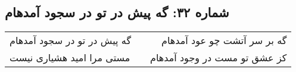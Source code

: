 \begin{center}
\section*{شماره ۳۲: گه پیش در تو در سجود آمدهام}
\label{sec:032}
\begin{longtable}{l p{0.5cm} r}
گه پیش در تو در سجود آمدهام
&&
گه بر سر آتشت چو عود آمدهام
\\
مستی مرا امید هشیاری نیست
&&
کز عشق تو مست در وجود آمدهام
\\
\end{longtable}
\end{center}
